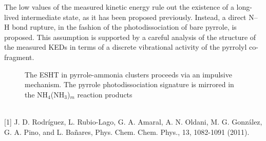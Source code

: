 The low values of the measured kinetic energy rule out the existence of a long-lived
intermediate state, as it has been proposed previously. Instead, a direct N--H bond
rupture, in the fashion of the photodissociation of bare pyrrole, is proposed. This
assumption is supported by a careful analysis of the structure of the measured KEDs
in terms of a discrete vibrational activity of the pyrrolyl co-fragment.
\\
\begin{figure}[h]
 \centerline{}
 \caption[]{ The ESHT in pyrrole-ammonia clusters proceeds via an impulsive mechanism.  The pyrrole photodissociation signature is mirrored in the NH$_{4}$(NH$_{3}$)$_{m}$ reaction products }
\end{figure}
\\
{\footnotesize
[1] J. D. Rodríguez, L. Rubio-Lago, G. A. Amaral, A. N. Oldani, M. G. González, G. A. Pino, and L.
Bañares, Phys. Chem. Chem. Phys., 13, 1082-1091 (2011).
}


